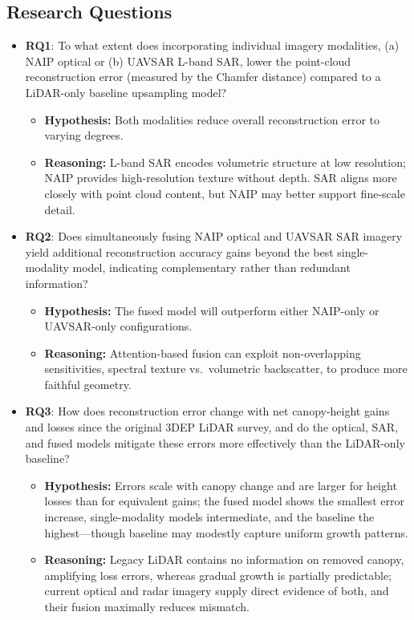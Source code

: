 \documentclass[preprint,12pt,authoryear]{elsarticle}
\begin{document}
\subsection{Research Questions}
\begin{itemize} 
  \item \textbf{RQ1}: To what extent does incorporating individual imagery modalities, (a) NAIP optical or (b) UAVSAR L-band SAR, lower the point-cloud reconstruction error (measured by the Chamfer distance) compared to a LiDAR-only baseline upsampling model?
        \begin{itemize}
          \item \textbf{Hypothesis:} Both modalities reduce overall reconstruction error to varying degrees.
          \item \textbf{Reasoning:} L-band SAR encodes volumetric structure at low resolution; NAIP provides high-resolution texture without depth. SAR aligns more closely with point cloud content, but NAIP may better support fine-scale detail. 
        \end{itemize}

  \item \textbf{RQ2}: Does simultaneously fusing NAIP optical and UAVSAR SAR imagery yield additional reconstruction accuracy gains beyond the best single-modality model, indicating complementary rather than redundant information?
        \begin{itemize}
          \item \textbf{Hypothesis:} The fused model will outperform either NAIP-only or UAVSAR-only configurations.
          \item \textbf{Reasoning:} Attention-based fusion can exploit non-overlapping sensitivities, spectral texture vs.\ volumetric backscatter, to produce more faithful geometry.
        \end{itemize}

  \item \textbf{RQ3}: How does reconstruction error change with net canopy-height gains and losses since the original 3DEP LiDAR survey, and do the optical, SAR, and fused models mitigate these errors more effectively than the LiDAR-only baseline?
        \begin{itemize}
            \item \textbf{Hypothesis:} Errors scale with canopy change and are larger for height losses than for equivalent gains; the fused model shows the smallest error increase, single-modality models intermediate, and the baseline the highest—though baseline may modestly capture uniform growth patterns. 
            \item \textbf{Reasoning:} Legacy LiDAR contains no information on removed canopy, amplifying loss errors, whereas gradual growth is partially predictable; current optical and radar imagery supply direct evidence of both, and their fusion maximally reduces mismatch.
        \end{itemize}
\end{itemize}
\end{document}
